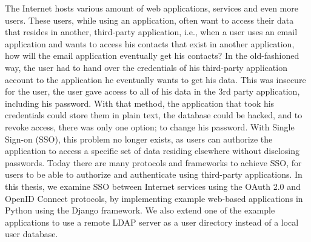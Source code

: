 
The Internet hosts various amount of web applications, services and even more users.
These users, while using an application, often want to access their data that resides in another, third-party application, i.e., when a user uses an email application and wants to access his contacts that exist in another application, how will the email application eventually get his contacts?
In the old-fashioned way, the user had to hand over the credentials of his third-party application account to the application he eventually wants to get his data.
This was insecure for the user, the user gave access to all of his data in the 3rd party application, including his password.
With that method, the application that took his credentials could store them in plain text, the database could be hacked, and to revoke access, there was only one option; to change his password. With Single Sign-on (SSO), this problem no longer exists, as users can authorize the application to access a specific set of data residing elsewhere without disclosing passwords.
Today there are many protocols and frameworks to achieve SSO, for users to be able to authorize and authenticate using third-party applications.
In this thesis, we examine SSO between Internet services using the OAuth 2.0 \cite{OAUTH} and OpenID Connect\cite{OIDC}  protocols, by implementing example web-based applications in Python using the Django\cite{Django} framework. We also extend one of the example applications to use a remote LDAP\cite{LDAP} server as a user directory instead of a local user database.
